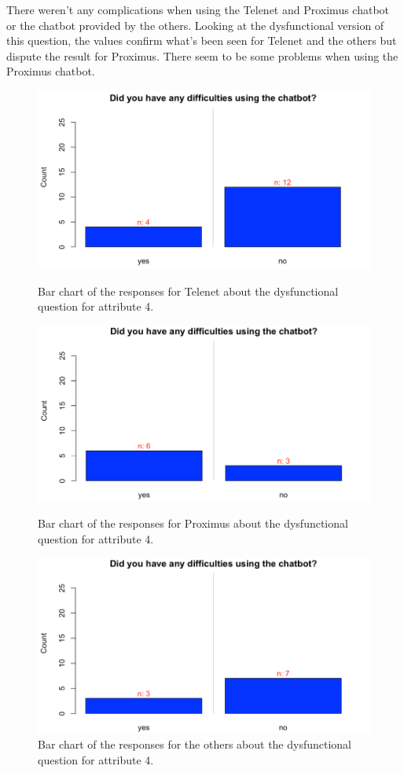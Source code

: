 There weren't any complications when using the Telenet and Proximus chatbot or the chatbot provided by the others. Looking at the dysfunctional version of this question, the values confirm what's been seen for Telenet and the others but dispute the result for Proximus. There seem to be some problems when using the Proximus chatbot.\\
\begin{figure}[!htb]
	\includegraphics[width=\linewidth]{../LaTeX/Figures/Comparative/DQ4T.png}
	\caption{Bar chart of the responses for Telenet about the dysfunctional question for attribute 4.}\label{fig:DQ4T}
	\endminipage\hfill
	\includegraphics[width=\linewidth]{../LaTeX/Figures/Comparative/DQ4P.png}
	\caption{Bar chart of the responses for Proximus about the dysfunctional question for attribute 4.}\label{fig:DQ4P}
	\endminipage\hfill
	\includegraphics[width=\linewidth]{../LaTeX/Figures/Comparative/DQ4O.png}
	\caption{Bar chart of the responses for the others about the dysfunctional question for attribute 4.}\label{fig:DQ4O}
	\endminipage\hfill
\end{figure}
